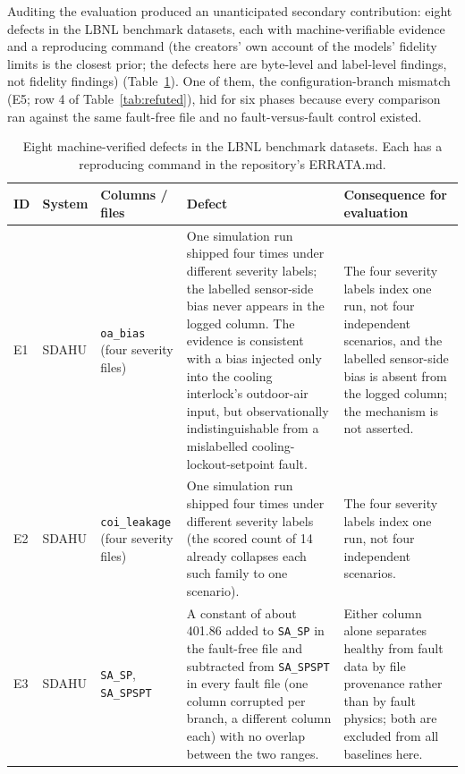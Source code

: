 \documentclass[11pt,letterpaper]{article}
\begin{document}
Auditing the evaluation produced an unanticipated secondary contribution: eight defects in the LBNL benchmark datasets, each with machine-verifiable evidence and a reproducing command (the creators' own account of the models' fidelity limits \cite{casillas2024ahufaultmodels} is the closest prior; the defects here are byte-level and label-level findings, not fidelity findings) (Table~\ref{tab:errata}). One of them, the configuration-branch mismatch (E5; row 4 of Table~\ref{tab:refuted}), hid for six phases because every comparison ran against the same fault-free file and no fault-versus-fault control existed.

\begin{table}[htbp]
\centering
\caption{Eight machine-verified defects in the LBNL benchmark datasets. Each has a reproducing command in the repository's ERRATA.md.}
\label{tab:errata}
\footnotesize
\setlength{\tabcolsep}{4pt}
\renewcommand{\arraystretch}{1.15}
\begin{tabular}{@{}>{\raggedright\arraybackslash}p{}>{\raggedright\arraybackslash}p{}>{\raggedright\arraybackslash}p{}>{\raggedright\arraybackslash}p{}>{\raggedright\arraybackslash}p{}@{}}
\hline
ID & System & Columns / files & Defect & Consequence for evaluation \\
\hline
E1 & SDAHU & \texttt{oa\_bias} (four severity files) & One simulation run shipped four times under different severity labels; the labelled sensor-side bias never appears in the logged column. The evidence is consistent with a bias injected only into the cooling interlock's outdoor-air input, but observationally indistinguishable from a mislabelled cooling-lockout-setpoint fault. & The four severity labels index one run, not four independent scenarios, and the labelled sensor-side bias is absent from the logged column; the mechanism is not asserted. \\
E2 & SDAHU & \texttt{coi\_leakage} (four severity files) & One simulation run shipped four times under different severity labels (the scored count of 14 already collapses each such family to one scenario). & The four severity labels index one run, not four independent scenarios. \\
E3 & SDAHU & \texttt{SA\_SP}, \texttt{SA\_SPSPT} & A constant of about 401.86 added to \texttt{SA\_SP} in the fault-free file and subtracted from \texttt{SA\_SPSPT} in every fault file (one column corrupted per branch, a different column each) with no overlap between the two ranges. & Either column alone separates healthy from fault data by file provenance rather than by fault physics; both are excluded from all baselines here. \\

\end{tabular}
\end{table}
\end{document}
